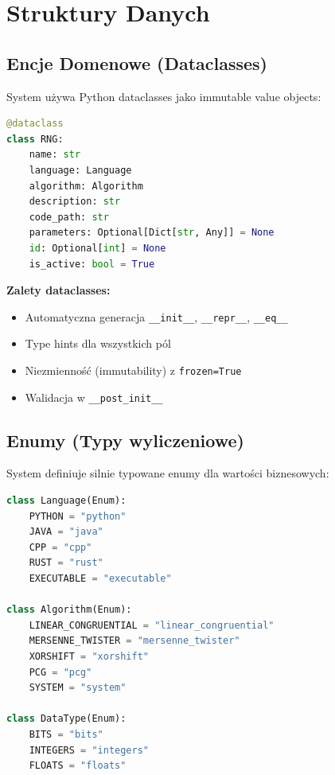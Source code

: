 \documentclass[12pt,a4paper]{article}
\begin{document}
\section{Struktury Danych}

\subsection{Encje Domenowe (Dataclasses)}

System używa Python dataclasses jako immutable value objects:

\begin{lstlisting}[language=Python, caption=Struktura encji RNG]
@dataclass
class RNG:
    name: str
    language: Language
    algorithm: Algorithm
    description: str
    code_path: str
    parameters: Optional[Dict[str, Any]] = None
    id: Optional[int] = None
    is_active: bool = True
\end{lstlisting}

\textbf{Zalety dataclasses:}
\begin{itemize}
    \item Automatyczna generacja \texttt{\_\_init\_\_}, \texttt{\_\_repr\_\_}, \texttt{\_\_eq\_\_}
    \item Type hints dla wszystkich pól
    \item Niezmienność (immutability) z \texttt{frozen=True}
    \item Walidacja w \texttt{\_\_post\_init\_\_}
\end{itemize}

\subsection{Enumy (Typy wyliczeniowe)}

System definiuje silnie typowane enumy dla wartości biznesowych:

\begin{lstlisting}[language=Python, caption=Enumy domenowe]
class Language(Enum):
    PYTHON = "python"
    JAVA = "java"
    CPP = "cpp"
    RUST = "rust"
    EXECUTABLE = "executable"

class Algorithm(Enum):
    LINEAR_CONGRUENTIAL = "linear_congruential"
    MERSENNE_TWISTER = "mersenne_twister"
    XORSHIFT = "xorshift"
    PCG = "pcg"
    SYSTEM = "system"

class DataType(Enum):
    BITS = "bits"
    INTEGERS = "integers"
    FLOATS = "floats"
\end{lstlisting}
\end{document}
